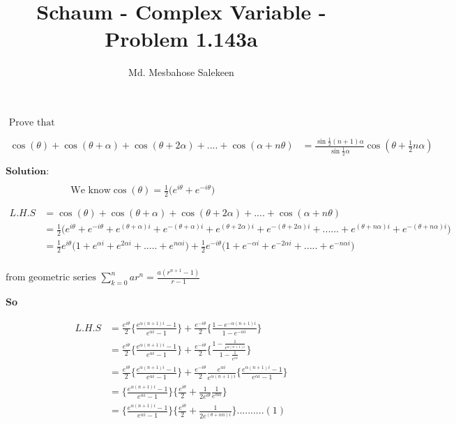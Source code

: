 \documentclass[fleqn]{article}
\title{Schaum - Complex Variable - Problem 1.143a}
\author{Md. Mesbahose Salekeen}
\begin{document}
\maketitle

$\text{ Prove that }$

\begin{align*}
\cos(\theta)+\cos(\theta+\alpha)+\cos(\theta+2\alpha)+....+\cos(\alpha+n\theta) &=\frac{\sin\frac{1}{2}(n+1)\alpha}{\sin\frac{1}{2}\alpha}\cos(\theta+\frac{1}{2}n\alpha)
\end{align*}

$\textbf{Solution:}$

$\hspace{80pt}\text{We know} \cos(\theta)=\frac{1}{2}\bigg(e^{i\theta}+e^{-i\theta}\bigg)$

\begin{align*}
	L.H.S &= \cos(\theta)+\cos(\theta+\alpha)+\cos(\theta+2\alpha)+....+\cos(\alpha+n\theta)\\
		  &=\frac{1}{2}\bigg(e^{i\theta}+e^{-i\theta}+e^{(\theta+\alpha)i}+e^{-(\theta+\alpha)i}+e^{(\theta+2\alpha)i}+e^{-(\theta+2\alpha)i}+......+e^{(\theta+n\alpha)i}+e^{-(\theta+n\alpha)i}\bigg)\\
		  &=\frac{1}{2}e^{i\theta}\bigg(1+e^{\alpha i}+e^{2\alpha i}+.....+e^{n\alpha i}\bigg)+\frac{1}{2}e^{-i\theta}\bigg(1+e^{-\alpha i}+e^{-2\alpha i}+.....+e^{-n\alpha i}\bigg)\\	  		  
\end{align*}

$\text{from geometric series }\sum_{k=0}^{n}ar^{n}=\frac{a(r^{n+1}-1)}{r-1}$

\vspace{.1 in}
\textbf{So}

\begin{align*}
L.H.S &= \frac{e^{i\theta}}{2}\Big\{\frac{e^{\alpha(n+1)i}-1}{e^{\alpha i}-1}\Big\}+\frac{e^{-i\theta}}{2}\Big\{\frac{1-e^{-\alpha(n+1)i}}{1-e^{-\alpha i}}\Big\}\\
	  &=\frac{e^{i\theta}}{2}\Big\{\frac{e^{\alpha(n+1)i}-1}{e^{\alpha i}-1}\Big\}+\frac{e^{-i\theta}}{2}\Big\{\frac{1-\frac{1}{e^{\alpha(n+1)i}}}{1-\frac{1}{e^{\alpha i}}}\Big\}\\
	  &=\frac{e^{i\theta}}{2}\Big\{\frac{e^{\alpha(n+1)i}-1}{e^{\alpha i}-1}\Big\}+\frac{e^{-i\theta}}{2}\frac{e^{\alpha i}}{e^{\alpha(n+1)i}}\Big\{\frac{e^{\alpha(n+1)i}-1}{e^{\alpha i}-1}\Big\}\\
	  &=\Big\{\frac{e^{\alpha(n+1)i}-1}{e^{\alpha i}-1}\Big\}\Big\{\frac{e^{i\theta}}{2}+\frac{1}{2e^{i\theta}}\frac{1}{e^{n\alpha}}\Big\}\\
	  &=\Big\{\frac{e^{\alpha(n+1)i}-1}{e^{\alpha i}-1}\Big\}\Big\{\frac{e^{i\theta}}{2}+\frac{1}{2e^{(\theta+\alpha n)i}}\Big\}..........(1)\\
\end{align*}
\end{document}
